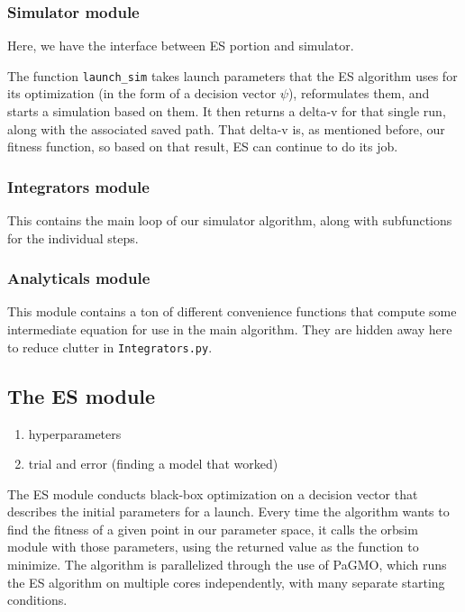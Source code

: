 \subsubsection{Simulator module}

Here, we have the interface between ES portion and simulator.

\noindent The function \texttt{launch\_sim} takes launch parameters that the ES algorithm uses for its optimization (in the form of a decision vector \(\psi\)), reformulates them, and starts a simulation based on them. It then returns a delta-v for that single run, along with the associated saved path. That delta-v is, as mentioned before, our fitness function, so based on that result, ES can continue to do its job.

\subsubsection{Integrators module}

This contains the main loop of our simulator algorithm, along with subfunctions for the individual steps.

\subsubsection{Analyticals module}

This module contains a ton of different convenience functions that compute some intermediate equation for use in the main algorithm. They are hidden away here to reduce clutter in \texttt{Integrators.py}.

\subsection{The ES module}
\begin{enumerate}
    \item hyperparameters
    \item trial and error (finding a model that worked)
\end{enumerate}

The ES module conducts black-box optimization on a decision vector that describes the initial parameters for a launch. Every time the algorithm wants to find the fitness of a given point in our parameter space, it calls the orbsim module with those parameters, using the returned value as the function to minimize. The algorithm is parallelized through the use of PaGMO, which runs the ES algorithm on multiple cores independently, with many separate starting conditions.


